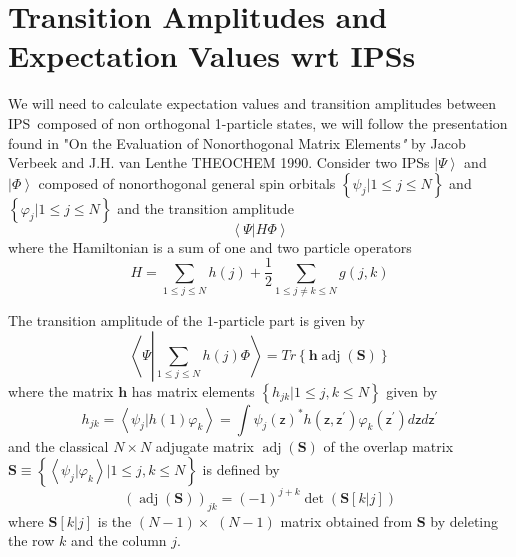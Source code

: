 \documentclass[aps,preprint]{revtex4}%
\begin{document}
\section{Transition Amplitudes and Expectation Values wrt IPSs\label{Transamp}%
}

We will need to calculate expectation values and transition amplitudes between
IPS\ composed of non orthogonal 1-particle states, we will follow the
presentation found in "On the Evaluation of Nonorthogonal Matrix
Elements\textit{" }by Jacob Verbeek and J.H. van Lenthe THEOCHEM 1990.
Consider two IPSs $\left\vert \Psi\right\rangle $ and $\left\vert
\Phi\right\rangle $ composed of nonorthogonal general spin orbitals $\left\{
\psi_{j}|1\leq j\leq N\right\}  $ and $\left\{  \varphi_{j}|1\leq j\leq
N\right\}  $ and the transition amplitude
\begin{equation}
\left\langle \Psi|H\Phi\right\rangle
\end{equation}
where the Hamiltonian is a sum of one and two particle operators
\begin{equation}
H=%
{\displaystyle\sum\limits_{1\leq j\leq N}}
h\left(  j\right)  +\frac{1}{2}%
{\displaystyle\sum\limits_{1\leq j\neq k\leq N}}
g\left(  j,k\right)
\end{equation}


The transition amplitude of the $1$-particle part is given by
\begin{equation}
\left\langle \Psi\left\vert
{\displaystyle\sum\limits_{1\leq j\leq N}}
h\left(  j\right)  \right.  \Phi\right\rangle =Tr\left\{  \mathbf{h}%
\operatorname{adj}\left(  \mathbf{S}\right)  \right\}
\end{equation}
where the matrix $\mathbf{h}$ has matrix elements $\left\{  h_{jk}|1\leq
j,k\leq N\right\}  $ given by
\begin{equation}
h_{jk}=\left\langle \psi_{j}|h\left(  1\right)  \varphi_{k}\right\rangle =%
{\displaystyle\int}
\psi_{j}\left(  \mathsf{z}\right)  ^{\ast}h\left(  \mathsf{z,z}^{\prime
}\right)  \varphi_{k}\left(  \mathsf{z}^{\prime}\right)  d\mathsf{z}%
d\mathsf{z}^{\prime}%
\end{equation}
and the classical $N\times N$ adjugate matrix $\operatorname{adj}\left(
\mathbf{S}\right)  $ of the overlap matrix $\mathbf{S\equiv}\left\{
\left\langle \psi_{j}|\varphi_{k}\right\rangle |1\leq j,k\leq N\right\}  $ is
defined by
\begin{equation}
\left(  \operatorname{adj}\left(  \mathbf{S}\right)  \right)  _{jk}=\left(
-1\right)  ^{j+k}\det\left(  \mathbf{S}\left[  k|j\right]  \right)
\end{equation}
where $\mathbf{S}\left[  k|j\right]  $ is the $\left(  N-1\right)  \times$
$\left(  N-1\right)  $ matrix obtained from $\mathbf{S}$ by deleting the row
$k$ and the column $j$.
\end{document}
